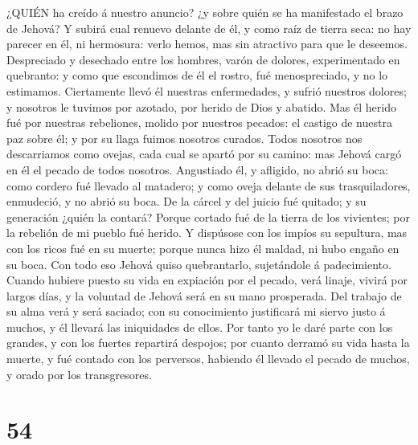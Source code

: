  ¿QUIÉN ha creído á nuestro anuncio? ¿y sobre quién se ha
manifestado el brazo de Jehová?  Y subirá cual renuevo
delante de él, y como raíz de tierra seca: no hay parecer en él, ni
hermosura: verlo hemos, mas sin atractivo para que le deseemos.
 Despreciado y desechado entre los hombres, varón de
dolores, experimentado en quebranto: y como que escondimos de él el
rostro, fué menospreciado, y no lo estimamos.  Ciertamente
llevó él nuestras enfermedades, y sufrió nuestros dolores; y nosotros le
tuvimos por azotado, por herido de Dios y abatido.  Mas él
herido fué por nuestras rebeliones, molido por nuestros pecados: el
castigo de nuestra paz sobre él; y por su llaga fuimos nosotros curados.
 Todos nosotros nos descarriamos como ovejas, cada cual se
apartó por su camino: mas Jehová cargó en él el pecado de todos
nosotros.  Angustiado él, y afligido, no abrió su boca: como
cordero fué llevado al matadero; y como oveja delante de sus
trasquiladores, enmudeció, y no abrió su boca.  De la cárcel
y del juicio fué quitado; y su generación ¿quién la contará? Porque
cortado fué de la tierra de los vivientes; por la rebelión de mi pueblo
fué herido.  Y dispúsose con los impíos su sepultura, mas
con los ricos fué en su muerte; porque nunca hizo él maldad, ni hubo
engaño en su boca.  Con todo eso Jehová quiso quebrantarlo,
sujetándole á padecimiento. Cuando hubiere puesto su vida en expiación
por el pecado, verá linaje, vivirá por largos días, y la voluntad de
Jehová será en su mano prosperada.  Del trabajo de su alma
verá y será saciado; con su conocimiento justificará mi siervo justo á
muchos, y él llevará las iniquidades de ellos.  Por tanto
yo le daré parte con los grandes, y con los fuertes repartirá despojos;
por cuanto derramó su vida hasta la muerte, y fué contado con los
perversos, habiendo él llevado el pecado de muchos, y orado por los
transgresores.

\hypertarget{section-53}{%
\section{54}\label{section-53}}


